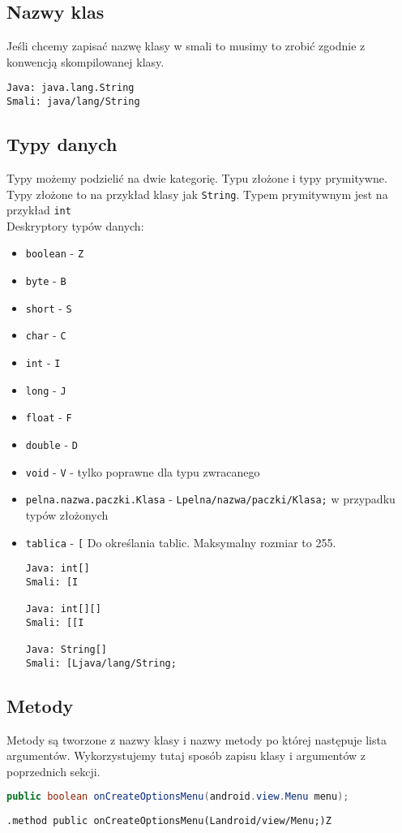 \documentclass[12pt,a4paper,leqno,oneside,titlepage]{book}
\begin{document}
\subsection{Nazwy klas}
%
Jeśli chcemy zapisać nazwę klasy w smali to musimy to zrobić zgodnie z konwencją skompilowanej klasy.
\begin{lstlisting}
Java: java.lang.String
Smali: java/lang/String
\end{lstlisting}
%
\subsection{Typy danych}
%
Typy możemy podzielić na dwie kategorię. Typu złożone i typy prymitywne. Typy złożone to na przykład klasy jak \verb|String|. Typem prymitywnym jest na przykład \verb|int|\cite{DexFormat,SmaliTypes}\\
Deskryptory typów danych:
\begin{itemize}
\item \verb|boolean| - \verb|Z|
\item \verb|byte| - \verb|B|
\item \verb|short| - \verb|S|
\item \verb|char| - \verb|C|
\item \verb|int| - \verb|I|
\item \verb|long| - \verb|J|
\item \verb|float| - \verb|F|
\item \verb|double| - \verb|D|
\item \verb|void| - \verb|V| - tylko poprawne dla typu zwracanego
\item \verb|pelna.nazwa.paczki.Klasa| - \verb|Lpelna/nazwa/paczki/Klasa;| w przypadku typów złożonych
\item \verb|tablica| - \verb|[| Do określania tablic. Maksymalny rozmiar to 255.
\begin{lstlisting}
Java: int[]
Smali: [I

Java: int[][]
Smali: [[I

Java: String[]
Smali: [Ljava/lang/String;
\end{lstlisting}
%
\end{itemize} 
%
\subsection{Metody}
%
Metody są tworzone z nazwy klasy i nazwy metody po której następuje lista argumentów. Wykorzystujemy tutaj sposób zapisu klasy i argumentów z poprzednich sekcji.
%
\begin{lstlisting}[language=Java,captionpos=b,caption={Java}]
public boolean onCreateOptionsMenu(android.view.Menu menu);
\end{lstlisting}
\begin{lstlisting}[language=smali,captionpos=b,caption={Smali}]
.method public onCreateOptionsMenu(Landroid/view/Menu;)Z
\end{lstlisting}
%
\end{document}

